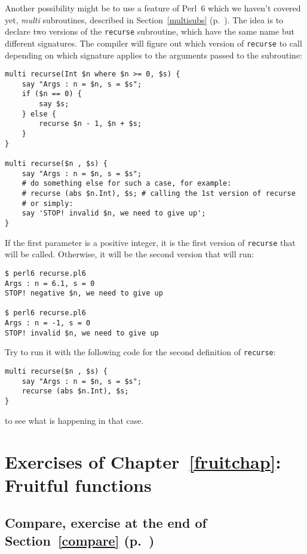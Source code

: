 Another possibility might be to use a feature of Perl~6 which 
we haven't covered yet, \emph{multi} subroutines, described in 
Section~\ref{multisubs} (p.~\pageref{multisubs}). The idea is 
to declare two versions of the {\tt recurse} subroutine, 
which have the same name but different signatures. 
The compiler will figure out which version of {\tt recurse} 
to call depending on which signature applies to the 
arguments passed to the subroutine:

\begin{verbatim}
multi recurse(Int $n where $n >= 0, $s) {
    say "Args : n = $n, s = $s";
    if ($n == 0) {
        say $s;
    } else {
        recurse $n - 1, $n + $s;
    }
}

multi recurse($n , $s) {
    say "Args : n = $n, s = $s";
    # do something else for such a case, for example:
    # recurse (abs $n.Int), $s; # calling the 1st version of recurse
    # or simply:
    say 'STOP! invalid $n, we need to give up';
}
\end{verbatim}

If the first parameter is a positive integer, it is the 
first version of {\tt recurse} that will be called. 
Otherwise, it will be the second version that will run:

\begin{verbatim}
$ perl6 recurse.pl6
Args : n = 6.1, s = 0
STOP! negative $n, we need to give up

$ perl6 recurse.pl6
Args : n = -1, s = 0
STOP! invalid $n, we need to give up
\end{verbatim}
%

Try to run it with the following code for the second 
definition of {\tt recurse}:

\begin{verbatim}
multi recurse($n , $s) {
    say "Args : n = $n, s = $s";
    recurse (abs $n.Int), $s;
}
\end{verbatim}
%
to see what is happening in that case.

\section{Exercises of Chapter~\ref{fruitchap}: Fruitful functions}

\subsection{Compare, exercise at the end of Section~\ref{compare} (p.~\pageref{compare})}
\label{sol_compare}

